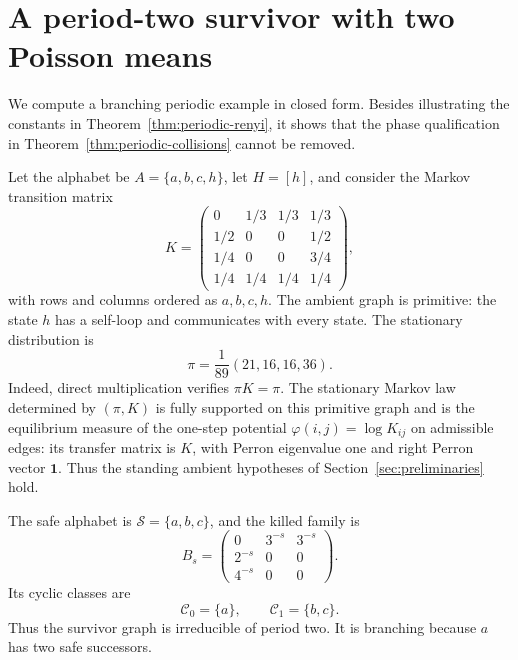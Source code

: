\section{A period-two survivor with two Poisson means}
\label{sec:periodic-example}

We compute a branching periodic example in closed form.  Besides
illustrating the constants in Theorem~\ref{thm:periodic-renyi}, it shows
that the phase qualification in
Theorem~\ref{thm:periodic-collisions} cannot be removed.

Let the alphabet be \(A=\{a,b,c,h\}\), let \(H=[h]\), and consider the
Markov transition matrix
\begin{equation}
  K=
  \begin{pmatrix}
    0&1/3&1/3&1/3\\
    1/2&0&0&1/2\\
    1/4&0&0&3/4\\
    1/4&1/4&1/4&1/4
  \end{pmatrix},
  \label{eq:example-K}
\end{equation}
with rows and columns ordered as \(a,b,c,h\).  The ambient graph is
primitive: the state \(h\) has a self-loop and communicates with every
state.  The stationary distribution is
\begin{equation}
  \pi=\frac1{89}(21,16,16,36).
  \label{eq:example-stationary}
\end{equation}
Indeed, direct multiplication verifies \(\pi K=\pi\).
The stationary Markov law determined by \((\pi,K)\) is fully supported
on this primitive graph and is the equilibrium measure of the one-step
potential \(\varphi(i,j)=\log K_{ij}\) on admissible edges: its transfer
matrix is \(K\), with Perron eigenvalue one and right Perron vector
\(\mathbf1\).  Thus the standing ambient hypotheses of
Section~\ref{sec:preliminaries} hold.

The safe alphabet is \(\mathcal S=\{a,b,c\}\), and the killed family is
\begin{equation}
  B_s=
  \begin{pmatrix}
    0&3^{-s}&3^{-s}\\
    2^{-s}&0&0\\
    4^{-s}&0&0
  \end{pmatrix}.
  \label{eq:example-Bs}
\end{equation}
Its cyclic classes are
\[
  \mathcal C_0=\{a\},
  \qquad
  \mathcal C_1=\{b,c\}.
\]
Thus the survivor graph is irreducible of period two.  It is branching
because \(a\) has two safe successors.

